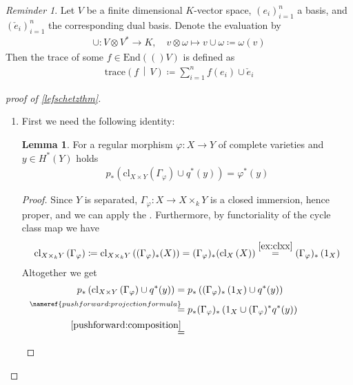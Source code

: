 \documentclass[english]{scrartcl}
\theoremstyle{definition}
\newtheorem{Lem}[Def]{Lemma}
\theoremstyle{remark}
\newtheorem{Rev}[Def]{Reminder}
\newcommand*{\End}[1]{\text{End}(#1)} %
\newcommand*{\Graph}[1]{{\Gamma_{#1}}} %
\newcommand*{\trace}[2]{{\text{trace}\left(#1 \,\middle|\, #2 \right)}} %
\newcommand*{\cl}[2]{{\text{cl}_{#1}\left(#2\right)}} %
\newcommand*{\one}[1]{{1_{#1}}}%
\renewcommand*{\phi}{\varphi}
\begin{document}
\begin{Rev}
  Let $V$ be a finite dimensional $K$-vector space, $(e_i)_{i=1}^n$ a basis,
  and $(\check e_i)_{i=1}^n$ the corresponding dual basis.
  Denote the evaluation by
  \begin{align*}
    \cup\colon V\otimes V^* \to K,\quad
    v\otimes \omega \mapsto v\cup\omega\coloneqq \omega(v)
  \end{align*}
  Then the trace of some $f\in\End(V)$ is defined as
  \begin{gather*}
    \trace{f}{V} \coloneqq \sum_{i=1}^n f(e_i)\cup \check e_i
  \end{gather*}
\end{Rev}

\begin{proof}[proof of \autoref{lefschetzthm}]~
  \begin{enumerate}[label={Step \arabic*.}]
  \item %
    First we need the following identity:
    \begin{Lem}\label{step1}
      For a regular morphism $\phi\colon X\to Y$ of complete varieties
      and $y\in H^*(Y)$ holds
      \begin{gather*}
        p_*\left(\cl{X\times Y}{\Graph{\phi}} \cup q^*(y)\right)
        = \phi^*(y)           
      \end{gather*}
      \begin{proof}
        Since $Y$ is separated, $\Graph{\phi}\colon X\to X\times_k Y$
        is a closed immersion, hence proper, and we can apply the 
        . %
        Furthermore, by functoriality of the cycle class map we have
        \begin{gather}
          \cl{X\times_k Y}{\Graph{\phi}} \coloneqq
          \cl{X\times_k Y}{(\Graph{\phi})_*(X)} =
          (\Graph{\phi})_*(\cl{X}{X}) \overset{\ref{ex:clxx}}{=} %
          (\Graph{\phi})_*\left(\one{X}\right)
        \end{gather}
        Altogether we get
        \begin{align*}
          p_*\left(\cl{X\times Y}{\Graph{\phi}} \cup q^*(y)\right)
          &=  p_*\left(
            (\Graph{\phi})_*\left(\one{X}\right) \cup q^*(y)
            \right)\\
          &\overset{\mathllap{\nameref{pushforward:projectionformula}}}{=}
            p_*(\Graph{\phi})_*\left( \one{X} \cup (\Graph{\phi})^*q^*(y) \right)\\
          &\overset{\mathllap{\eqref{pushforward:composition}}}=

\end{align*}
\end{proof}
\end{Lem}
\end{enumerate}
\end{proof}
\end{document}
